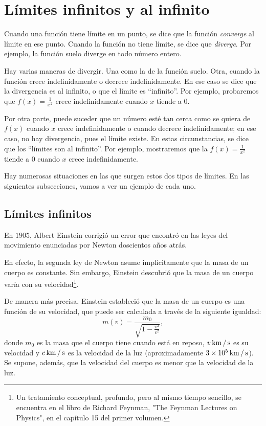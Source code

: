 \section{Límites infinitos y al infinito}
Cuando una función tiene límite en un punto, se dice que la función \emph{converge} al límite en
ese punto. Cuando la función no tiene límite, se dice que \emph{diverge}. Por ejemplo, la función
suelo diverge en todo número entero.

Hay varias maneras de divergir. Una como la de la función suelo. Otra, cuando la función crece
indefinidamente o decrece indefinidamente. En ese caso se dice que la divergencia es al infinito, o
que el límite es ``infinito''. Por ejemplo, probaremos que $f(x) = \frac{1}{x^2}$ crece
indefinidamente cuando $x$ tiende a $0$.

Por otra parte, puede suceder que un número esté tan cerca como se quiera de $f(x)$ cuando $x$
crece indefinidamente o cuando decrece indefinidamente; en ese caso, no hay divergencia, pues el
límite existe. En estas circunstancias, se dice que los ``límites son al infinito''. Por ejemplo,
mostraremos que la $f(x) = \frac{1}{x^2}$ tiende a $0$ cuando $x$ crece indefinidamente.

Hay numerosas situaciones en las que surgen estos dos tipos de límites. En las siguientes
subsecciones, vamos a ver un ejemplo de cada uno.

\subsection{Límites infinitos}
En $1905$, Albert Einstein corrigió un error que encontró en las leyes del movimiento enunciadas
por Newton doscientos años atrás.

En efecto, la segunda ley de Newton asume implícitamente que la masa de un cuerpo es constante. Sin
embargo, Einstein descubrió que la masa de un cuerpo varía con su velocidad\footnote{Un tratamiento
conceptual, profundo, pero al mismo tiempo sencillo, se encuentra en el libro de Richard Feynman,
"The Feynman Lectures on Physics", en el capítulo 15 del primer volumen.}.

De manera más precisa, Einstein estableció que la masa de un cuerpo es una función de su velocidad,
que puede ser calculada a través de la siguiente igualdad:
\[
m(v) = \frac{m_0}{\sqrt{1 - \frac{v^2}{c^2}}},
\]
donde $m_0$ es la masa que el cuerpo tiene cuando está en reposo, $v\operatorname{km}/\operatorname{s}$ es su
velocidad y $c\operatorname{km}/\operatorname{s}$ es la velocidad de la luz (aproximadamente $3 \times 10^5
\operatorname{km}/\operatorname{s}$). Se supone, además, que la velocidad del cuerpo es menor que la velocidad
de la luz.

